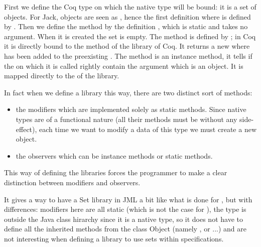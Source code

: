 First we define the Coq type on which the  native type 
will be bound: it is a set of objects. For Jack, objects are seen as 
, hence the first definition where  
is defined by .
Then we define the method  by the definition 
, which is static and takes no argument. 
When it is created the set is empty.
The  method is defined by ; in Coq it is 
directly bound to the  method of the library  
of Coq. 
It returns a new  where  has been added to
the preexisting  .
The  method is an instance method, it tells if the 
 on which it is called rightly
contain the argument  which is an object. It is mapped directly to the 
 of the  library.


In fact when we define a library this way, there are two distinct sort of 
methods:
\begin{itemize}
\item the modifiers which are implemented solely as static methods. 
Since native types are of a functional nature (all their methods must be without any side-effect), 
each time we want to modify a data of this type we must create a new object.
\item the observers which can be instance methods or static methods.
\end{itemize}
This way of defining the libraries forces the programmer to make a clear distinction 
between modifiers and observers.

   
 It gives a way to have a Set library in JML a bit like what is done for 
\cite{LPCCR-03-JML}, but with differences: modifiers here are all static
(which is not the case for  ),
 the  type is outside the Java class hirarchy since it is a native type,
so it does not have 
to define all the inherited methods from the class Object 
(namely ,  or 
...) and are not interesting when defining a library to use sets within specifications.